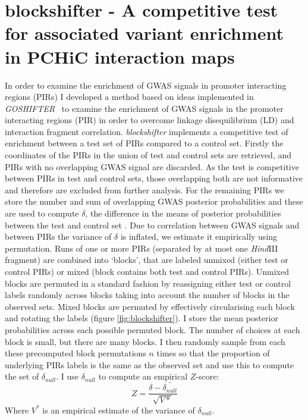 \documentclass[a4paper,11pt]{report}
\begin{document}
\section{blockshifter - A competitive test for associated variant enrichment in PCHiC interaction maps}
In order to examine the enrichment of GWAS signals in promoter interacting regions (PIRs) I developed a method based on ideas implemented in \textit{GOSHIFTER}~\citep{Trynka2015-wz} to examine the enrichment of GWAS signals in the promoter interacting regions (PIR) in order to overcome linkage disequilibrium (LD) and interaction fragment correlation. \textit{blockshifter} implements a competitive test of enrichment between a test set of PIRs compared to a control set. Firstly the coordinates of the PIRs in the union of test and control sets are retrieved, and PIRs with no overlapping GWAS signal  are discarded. As the test is competitive between PIRs in test and control sets, those overlapping both are not informative and therefore are excluded from further analysis. For the remaining PIRs we store the number and sum of overlapping GWAS posterior probabilities and these are used to compute $\delta$, the difference in the means of posterior probabilities between the test and control set . Due to correlation between GWAS signals and between PIRs the variance of $\delta$ is inflated, we estimate it empirically using permutation.  Runs of one or more PIRs (separated by at most one \textit{Hind}III fragment) are combined into ‘blocks’, that are labeled unmixed (either test or control PIRs) or mixed (block contains both test and control PIRs).  Unmixed blocks are permuted in a standard fashion by reassigning either test or control labels randomly across blocks taking into account the number of blocks in the observed sets. Mixed blocks are permuted by effectively circularising each block and rotating the labels (figure \ref{fig:blockshifter}). I store the mean posterior probabilities across each possible permuted block. The number of choices at each block is small, but there are many blocks. I then randomly sample from each these precomputed block permutations $n$ times so that the proportion of underlying PIRs labels is the same as the observed set and use this to compute the set of $\delta_{null}$. I use $\delta_{null}$ to compute an empirical $Z$-score:
\begin{equation}
Z = \frac{\delta - \bar{\delta_{null}}}{\sqrt{V*}}
\end{equation}
Where $V^{*}$ is an empirical estimate of the variance of $\delta_{null}$. 
\end{document}
